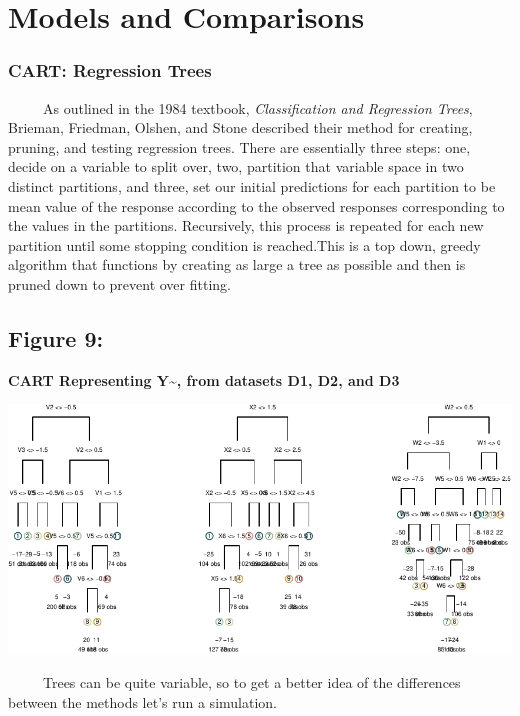 \documentclass[12pt,twoside]{reedthesis}
\begin{document}
  \section{Models and Comparisons}\label{models-and-comparisons}
  
  \subsubsection{CART: Regression Trees}\label{cart-regression-trees}
  
  ~~~~~As outlined in the 1984 textbook, \emph{Classification and
  Regression Trees}, Brieman, Friedman, Olshen, and Stone described their
  method for creating, pruning, and testing regression trees. There are
  essentially three steps: one, decide on a variable to split over, two,
  partition that variable space in two distinct partitions, and three, set
  our initial predictions for each partition to be mean value of the
  response according to the observed responses corresponding to the values
  in the partitions. Recursively, this process is repeated for each new
  partition until some stopping condition is reached.This is a top down,
  greedy algorithm that functions by creating as large a tree as possible
  and then is pruned down to prevent over fitting.
  
  \subsection{Figure 9:}\label{figure-9}
  
  \textbf{CART Representing Y\textasciitilde{}, from datasets D1, D2, and
  D3}
  
  \includegraphics{Thesis_files/figure-latex/fig9-1.pdf}
  
  ~~~~~Trees can be quite variable, so to get a better idea of the
  differences between the methods let's run a simulation.
  
\end{document}
